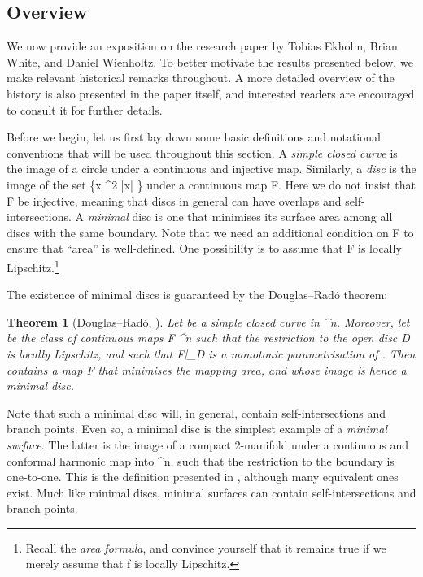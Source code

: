 \documentclass[a4paper, 11pt]{article}
\theoremstyle{plain}
\newtheorem{theorem}{Theorem}[section]
\theoremstyle{definition}
\theoremstyle{remark}
\numberwithin{equation}{subsection}
\def\({}
\def\){}
\begin{document}
\subsection{Overview}

We now provide an exposition on the research paper \cite{EWW02} by Tobias Ekholm, Brian White, and Daniel Wienholtz. To better motivate the results presented below, we make relevant historical remarks throughout. A more detailed overview of the history is also presented in the paper itself, and interested readers are encouraged to consult it for further details. 

Before we begin, let us first lay down some basic definitions and notational conventions that will be used throughout this section. A \emph{simple closed curve} is the image of a circle under a continuous and injective map. Similarly, a \emph{disc} is the image of the set \( \coloneq \{x \in {}^{2} \vcentcolon |x| \}\) under a continuous map \(F\). Here we do not insist that \(F\) be injective, meaning that discs in general can have overlaps and self-intersections. A \emph{minimal} disc is one that minimises its surface area among all discs with the same boundary. Note that we need an additional condition on \(F\) to ensure that ``area'' is well-defined. One possibility is to assume that \(F\) is locally Lipschitz.\footnote{Recall the \emph{area formula}, and convince yourself that it remains true if we merely assume that \(f\) is locally Lipschitz.}

The existence of minimal discs is guaranteed by the Douglas--Rad{\'o} theorem:

\begin{theorem}[{Douglas--Rad{\'o}, \cite[Theorem 35]{Whi16}}]
Let \(\Gamma\) be a simple closed curve in \(^{n}\). Moreover, let \(\) be the class of continuous maps \(F \vcentcolon {} \rightarrow {}^{n}\) such that the restriction to the open disc \(D\) is locally Lipschitz, and such that \(F\big|_{\partial D}\) is a monotonic parametrisation of \(\Gamma\). Then \(\) contains a map \(F\) that minimises the mapping area, and whose image is hence a minimal disc.
\end{theorem}

Note that such a minimal disc will, in general, contain self-intersections and branch points. Even so, a minimal disc is the simplest example of a \emph{minimal surface}. The latter is the image of a compact 2-manifold under a continuous and conformal harmonic map into \(^{n}\), such that the restriction to the boundary is one-to-one. This is the definition presented in \cite{EWW02}, although many equivalent ones exist. Much like minimal discs, minimal surfaces can contain self-intersections and branch points.
\end{document}
